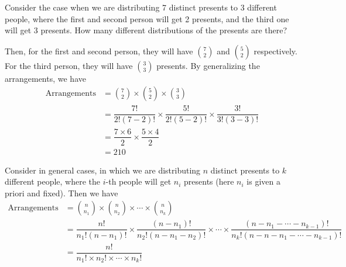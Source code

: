 \begin{eg}
    Consider the case when we are distributing 7 distinct presents to 3 different people, where the first and second person will get 2 presents, and the third one will get 3 presents. How many different distributions of the presents are there?

    Then, for the first and second person, they will have \(\binom{7}{2}\) and \(\binom{5}{2}\) respectively. For the third person, they will have \(\binom{3}{3}\) presents. By generalizing the arrangements, we have 
    \[
    \begin{aligned}
        \text{Arrangements} &= \binom{7}{2} \times \binom{5}{2} \times \binom{3}{3} \\
        &= \dfrac{7!}{2!(7 - 2)!} \times \dfrac{5!}{2!(5 - 2)!} \times \dfrac{3!}{3!(3 - 3)!} \\
        &= \dfrac{7 \times 6}{2} \times \dfrac{5 \times 4}{2} \\
        &= 210
    \end{aligned}
    \]
\end{eg}
\begin{corollary}
    Consider in general cases, in which we are distributing \(n\) distinct presents to \(k\) different people, where the \(i\)-th people will get \(n_i\) presents (here \(n_i\) is given a priori and fixed). Then we have 
\[
    \begin{aligned}
        \text{Arrangements} &= \binom{n}{n_1} \times \binom{n}{n_2} \times \cdots \times \binom{n}{n_k} \\
        &= \dfrac{n!}{n_1!(n - n_1)!} \times \dfrac{(n - n_1)!}{n_2!(n - n_1 - n_2)!} \times \cdots \times \dfrac{(n - n_1 - \cdots - n_{k - 1})!}{n_k!(n - n - n_1 - \cdots - n_{k - 1})!} \\
        &= \dfrac{n!}{n_1! \times n_2! \times \cdots \times n_k!}
    \end{aligned}
\]
\end{corollary}

